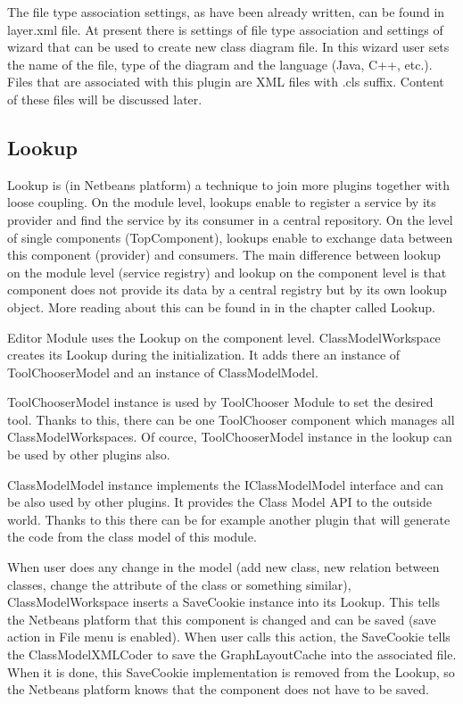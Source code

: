 The file type association settings, as have been already written, can be found in layer.xml file. At present there is settings of file type association and settings of wizard that can be used to create new class diagram file. In this wizard user sets the name of the file, type of the diagram and the language (Java, C++, etc.). Files that are associated with this plugin are XML files with .cls suffix. Content of these files will be discussed later.

\subsection{Lookup}
\label{subsection:lookup}

Lookup is (in Netbeans platform) a technique to join more plugins together with loose coupling. On the module level, lookups enable to register a service by its provider and find the service by its consumer in a central repository. On the level of single components (TopComponent), lookups enable to exchange data between this component (provider) and consumers. The main difference between lookup on the module level (service registry) and lookup on the component level is that component does not provide its data by a central registry but by its own lookup object. More reading about this can be found in \cite{netbeans6.9DevGuide} in the chapter called Lookup.

Editor Module uses the Lookup on the component level. ClassModelWorkspace creates its Lookup during the initialization. It adds there an instance of ToolChooserModel and an instance of ClassModelModel.

ToolChooserModel instance is used by ToolChooser Module to set the desired tool. Thanks to this, there can be one ToolChooser component which manages all ClassModelWorkspaces. Of cource, ToolChooserModel instance in the lookup can be used by other plugins also.

ClassModelModel instance implements the IClassModelModel interface and can be also used by other plugins. It provides the Class Model API to the outside world. Thanks to this there can be for example another plugin that will generate the code from the class model of this module.

When user does any change in the model (add new class, new relation between classes, change the attribute of the class or something similar), ClassModelWorkspace inserts a SaveCookie instance into its Lookup. This tells the Netbeans platform that this component is changed and can be saved (save action in File menu is enabled). When user calls this action, the SaveCookie tells the ClassModelXMLCoder to save the GraphLayoutCache into the associated file. When it is done, this SaveCookie implementation is removed from the Lookup, so the Netbeans platform knows that the component does not have to be saved.

